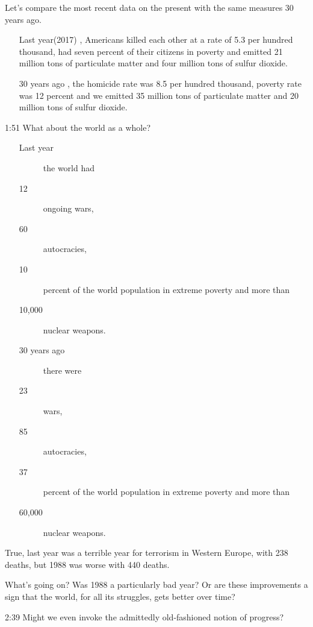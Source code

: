 \documentclass[10pt,titlepage]{article}
\begin{document}
Let's compare the most recent data on the present
with the same measures 30 years ago.
\begin{itemize}
\item[Last year(2017)], Americans killed each other at a rate of 5.3 per hundred thousand,
had seven percent of their citizens in poverty
and emitted 21 million tons of particulate matter
and four million tons of sulfur dioxide.
\item[30 years ago], the homicide rate was 8.5 per hundred thousand,
poverty rate was 12 percent
and we emitted 35 million tons of particulate matter
and 20 million tons of sulfur dioxide.
\end{itemize}
1:51
What about the world as a whole?
\begin{itemize}
\item[Last year]
  \begin{description}
    \item[] the world had
    \item[12] ongoing wars,
\item[60] autocracies,
\item[10] percent of the world population in extreme poverty
  and more than
\item[10,000] nuclear weapons.
  \end{description}
\item[30 years ago]
  \begin{description}
  \item[]  there were
    \item[23] wars,
\item[85] autocracies,
\item[37] percent of the world population in extreme poverty
  and more than
\item[60,000] nuclear weapons.
   \end{description}
\end{itemize}

True, last year was a terrible year for terrorism in Western Europe,
with 238 deaths,
but 1988 was worse with 440 deaths.

What's going on?
Was 1988 a particularly bad year?
Or are these improvements a sign that the world, for all its struggles,
gets better over time?

2:39
Might we even invoke the admittedly old-fashioned notion of progress?
\end{document}
